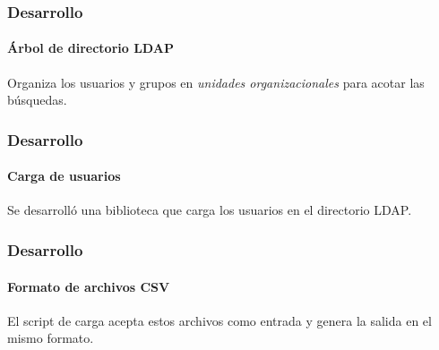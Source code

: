 \documentclass{beamer}
\begin{document}
\begin{frame}
\frametitle{Desarrollo}
\framesubtitle{\'{A}rbol de directorio \textup{LDAP}}

Organiza los usuarios y grupos en \emph{unidades organizacionales} para acotar las b\'{u}squedas.

\vspace{1.0em}

\centering
 {
  
 }

\end{frame}


\begin{frame}
\frametitle{Desarrollo}
\framesubtitle{Carga de usuarios}

Se desarroll\'{o} una biblioteca que carga los usuarios en el directorio \textup{LDAP}.

\vspace{1.5em}

\centering
 {
  
 }

\end{frame}


\begin{frame}
\frametitle{Desarrollo}
\framesubtitle{Formato de archivos \textup{CSV}}

El script de carga acepta estos archivos como entrada y genera la salida en el mismo formato.

\vspace{2em}

\centering
{
 \begin{table}[H]
 \label{tab:csv-format}
 \noindent{} %
 \end{table}
}


\end{frame}
\end{document}
